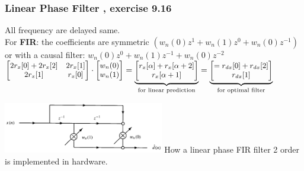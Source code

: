 \begin{minipage}{11.5cm}
\subsubsection{Linear Phase Filter , exercise 9.16} 
All frequency are delayed same. \\
For \textbf{FIR}: the coefficients are symmetric $(w_n(0)z^1+w_n(1)z^0+w_n(0)z^{-1})$ or with a causal filter: $w_n(0)z^0 + w_n(1)z^{-1} + w_n(0)z^{-2}$\\
$\small \begin{bmatrix}
2 r_x[0] + 2 r_x[2]		&	2 r_x[1] \\
2 r_x[1]				& 	r_x[0]
\end{bmatrix} \cdot \begin{bmatrix}
w_n(0)\\
w_n(1)
\end{bmatrix}= \underbrace{ \begin{bmatrix}
r_x[\alpha] + r_x[\alpha+2]\\
r_x[\alpha+1]
\end{bmatrix}}_{\text{for linear prediction} } 
= \underbrace{ \begin{bmatrix} = 
r_{dx}[0] + r_{dx}[2]\\
r_{dx}[1]
\end{bmatrix}    }_{\text{for optimal filter} }  $

\end{minipage}
\hspace{3mm}
\begin{minipage}{7cm}
\includegraphics[width=7cm]{../TSM_StatDig/bilder/linear_phase_fir.png}
How a linear phase FIR filter 2 order is implemented in hardware.
\end{minipage}
